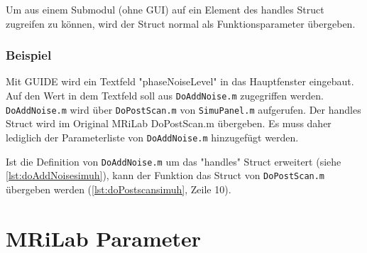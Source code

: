 Um aus einem Submodul (ohne GUI) auf ein Element des handles Struct zugreifen zu können, wird der Struct normal als Funktionsparameter übergeben.

\subsubsection{Beispiel}
Mit GUIDE wird ein Textfeld "phaseNoiseLevel" in das Hauptfenster eingebaut.
Auf den Wert in dem Textfeld soll aus \texttt{DoAddNoise.m} zugegriffen werden. \texttt{DoAddNoise.m} wird über \texttt{DoPostScan.m} von \texttt{SimuPanel.m} aufgerufen. Der handles Struct wird im Original MRiLab DoPostScan.m übergeben. Es muss daher lediglich der Parameterliste von \texttt{DoAddNoise.m} hinzugefügt werden.


Ist die Definition von \texttt{DoAddNoise.m} um das "handles" Struct erweitert (siehe \autoref{lst:doAddNoisesimuh}), kann der Funktion das Struct von \texttt{DoPostScan.m} übergeben werden (\autoref{lst:doPostscansimuh}, Zeile 10).



\section{MRiLab Parameter}

